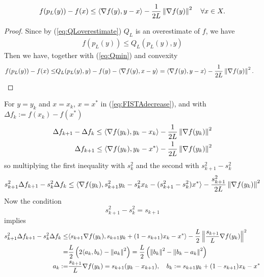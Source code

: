 \documentclass[12pt,english]{article}
\begin{document}
%
\begin{lemma}\label{lemma:FISTAdecrease}
%
\begin{equation}\label{eq:FISTAdecrease}
f(p_L(y))-f(x) \le   \langle\nabla f(y),y-x\rangle -\frac{1}{2L}\left\|\nabla f(y)\right\|^2 \quad\forall x\in X.
\end{equation}
%
\end{lemma}
%
\begin{proof}
%
Since by (\ref{eq:QLoverestimate}) $Q_L$ is an overestimate of $f$, we have 
%
\begin{align*}
f(p_L(y))\le Q_L(p_L(y), y)
\end{align*}
%
Then we have, together with (\ref{eq:Qmin}) and convexity
%
%
\begin{align*}
f(p_L(y))-f(x) \le& Q_L(p_L(y), y) -f(y) - \langle\nabla f(y),x-y\rangle
= \langle\nabla f(y),y-x\rangle -\frac{1}{2L}\left\|\nabla f(y)\right\|^2 .
\end{align*}
%
\end{proof}
%
%
For $y=y_k$ and $x=x_k$, $x=x^*$ in (\ref{eq:FISTAdecrease}), and with $\Delta f_k := f(x_k)- f(x^*)$
%
\begin{align*}
\Delta f_{k+1} - \Delta f_{k}\le  \langle\nabla f(y_k),y_k-x_k\rangle - \frac{1}{2L}\left\|\nabla f(y_k)\right\|^2 \\
\Delta f_{k+1} \le \langle\nabla f(y_k),y_k-x^*\rangle - \frac{1}{2L}\left\|\nabla f(y_k)\right\|^2  
\end{align*}
%
so multiplying the first inequality with $s_{k}^2$ and the second with $s_{k+1}^2-s_{k}^2$
%
\begin{align*}
 s_{k+1}^2\Delta f_{k+1}-s_{k}^2 \Delta f_{k} \le 
  \langle\nabla f(y_k),s_{k+1}^2y_k-s_{k}^2 x_k -(s_{k+1}^2-s_{k}^2) x^*\rangle-\frac{s_{k+1}^2}{2L}\left\|\nabla f(y_k)\right\|^2
\end{align*}
%
%
Now the condition
%
\begin{equation}\label{eq:}
s_{k+1}^2-s_{k}^2 =s_{k+1}
\end{equation}
%
implies
%
\begin{align*}
s_{k+1}^2 \Delta f_{k+1}-s_{k}^2 \Delta f_{k} \le& 
  \langle s_{k+1}\nabla f(y_k),s_{k+1}y_k+(1-s_{k+1}) x_k - x^*\rangle-\frac{L}{2}\left\|\frac{s_{k+1}}{L}\nabla f(y_k)\right\|^2\\
=& \frac{L}{2}\left(2\langle a_k,b_k\rangle-\left\|a_k\right\|^2 \right) =
\frac{L}{2}\left(\left\|b_k\right\|^2-\left\|b_k-a_k\right\|^2 \right)\\
a_k:=& \frac{s_{k+1}}{L}\nabla f(y_k) = s_{k+1}(y_k-x_{k+1}),\quad
b_k :=  s_{k+1}y_k + (1-s_{k+1}) x_k -x^*
\end{align*}
\end{document}
